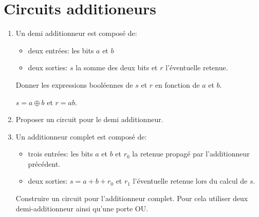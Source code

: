 \documentclass[a4paper,10pt]{exam}
\begin{document}
\section{Circuits additioneurs}
\begin{enumerate}
\item Un demi additionneur est composé de:
  \begin{itemize}
  \item deux entrées: les bits $a$ et $b$
  \item deux sorties: $s$ la somme des deux bits et $r$ l'éventuelle retenue.
  \end{itemize}
  Donner les expressions booléennes de $s$ et $r$ en fonction de $a$ et $b$.
\begin{solution}
  $s = a \oplus b$ et $r = ab$.
\end{solution}
\item Proposer un circuit pour le demi additionneur.
\begin{solution}
\end{solution}
\item Un additionneur complet est composé de:
  \begin{itemize}
    \item trois entrées: les bits $a$ et $b$ et $r_0$ la retenue
      propagé par l'additionneur précédent.
    \item deux sorties: $s = a + b + r_0$ et $r_1$ l'éventuelle retenue lors
      du calcul de $s$.
  \end{itemize}
  Construire un circuit pour l'additionneur complet. Pour cela utiliser
  deux demi-additionneur ainsi qu'une porte OU.


\end{enumerate}
\end{document}
